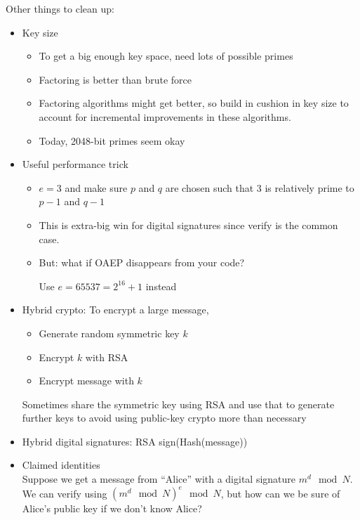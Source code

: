 Other things to clean up:
\begin{itemize}
    \item Key size
    \begin{itemize}
        \item To get a big enough key space, need lots of possible primes
        \item Factoring is better than brute force
        \item Factoring algorithms might get better, so build in cushion in key
            size to account for incremental improvements in these algorithms.
        \item Today, 2048-bit primes seem okay
    \end{itemize}
    \item Useful performance trick
    \begin{itemize}
        \item $e = 3$ and make sure $p$ and $q$ are chosen
    such that 3 is relatively prime to $p-1$ and $q-1$
        \item This is extra-big win
    for digital signatures since verify is the common case.
        \item But: what if OAEP disappears from your code?

        Use $e=65537=2^{16} + 1$ instead 
    \end{itemize}
    \item Hybrid crypto: To encrypt a large message,
    \begin{itemize}
        \item Generate random symmetric key $k$
        \item Encrypt $k$ with RSA
        \item Encrypt message with $k$
    \end{itemize}
        Sometimes share the symmetric key using RSA and use that to generate
        further keys to avoid using public-key crypto more than necessary
    \item Hybrid digital signatures: RSA sign(Hash(message))
    \item Claimed identities\\
        Suppose we get a message from ``Alice'' with a digital signature $m^d
        \mod N$. We can verify using $(m^d \mod N)^e \mod N$, but how can we be
        sure of Alice's public key if we don't know Alice?


\end{itemize}
